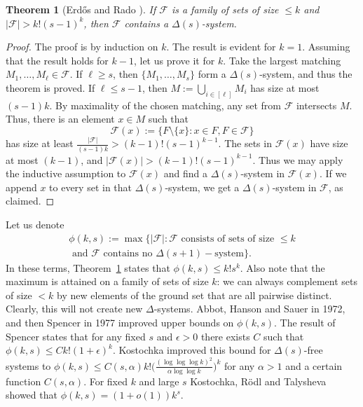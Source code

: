 \documentclass[graybox]{svmult}
\renewcommand{\le}{\leqslant}
\renewcommand{\ge}{\geqslant}
\newcommand{\ff}{\mathcal{F}}
\newtheorem{thm}{Theorem}
\begin{document}
\begin{thm}[Erd\H os and Rado \cite{ER}]\label{thmer}
If $\ff$ is a family of sets of size $\le k$ and $|\ff|> k!(s-1)^k$, then $\ff$ contains a $\Delta(s)$-system.
\end{thm}
\begin{proof}
  The proof is by induction on $k$. The result is evident for $k=1$. Assuming that the result holds for $k-1$, let us prove it for $k$. Take the largest matching $M_1,\ldots, M_{\ell}\in \ff$. If $\ell\ge s$, then $\{M_1,\ldots, M_s\}$ form a $\Delta(s)$-system, and thus the theorem is proved. If $\ell\le s-1$, then $M:=\bigcup_{i\in[\ell]} M_i$ has size at most $(s-1)k$. By maximality of the chosen matching, any set from $\ff$ intersects $M$. Thus, there is an element $x\in M$  such that
  $$\ff(x):=\{F\setminus \{x\}: x\in F, F\in \ff\}$$
  has size at least $\frac{|\ff|}{(s-1)k}>(k-1)!(s-1)^{k-1}$. The sets in $\ff(x)$ have size at most $(k-1)$, and $|\ff(x)|>(k-1)!(s-1)^{k-1}$. Thus we may apply the inductive assumption to $\ff(x)$ and find a $\Delta(s)$-system in $\ff(x)$. If we append $x$ to every set in that $\Delta(s)$-system, we get a $\Delta(s)$-system in $\ff$, as claimed.
\end{proof}

Let us denote
\begin{multline}\label{eqphi}\phi(k,s):=\max\big\{|\ff|: \ff \text { consists of sets of size }\le k\\ \text{ and }\ff \text{ contains no }\Delta(s+1)-\text{system}\big\}.\end{multline}
In these terms, Theorem~\ref{thmer} states that $\phi(k,s)\le k!s^k$. Also note that the maximum is attained on a family of sets of size $k$: we can always complement sets of size $<k$ by new elements of the ground set that are all pairwise distinct. Clearly, this will not create new $\Delta$-systems. Abbot, Hanson and Sauer \cite{AHS} in 1972, and then Spencer \cite{S} in 1977 improved upper bounds on $\phi(k,s)$. The result of Spencer states that for any fixed $s$ and $\epsilon>0$ there exists $C$ such that $\phi(k,s)\le Ck!(1+\epsilon)^k$. Kostochka \cite{Kost} improved this bound for $\Delta(s)$-free systems to $\phi(k,s)\le C(s,\alpha)k! \Big(\frac{(\log\log\log k)^2}{\alpha \log\log k}\Big)^k$ for any $\alpha>1$ and a certain function $C(s,\alpha)$. For fixed $k$ and large $s$ Kostochka, R\"odl and Talysheva \cite{KRT} showed that $\phi(k,s) = (1+o(1))k^{s}$.
\end{document}
